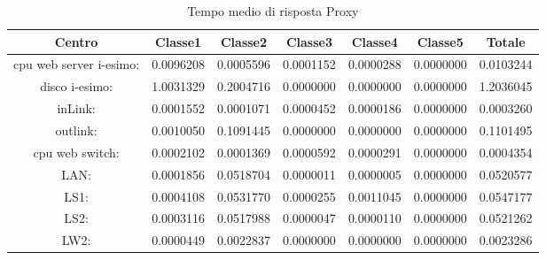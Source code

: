 \begin{table}[H]
\begin{center}\begin{scriptsize}
\begin{tabular}{||c|c|c|c|c|c|c||}
\hline
Centro &Classe1 &Classe2 &Classe3 &Classe4 &Classe5 &Totale\\
\hline
\hline
 cpu web server i-esimo: 	&0.0096208	&0.0005596	&0.0001152	&0.0000288	&0.0000000	&0.0103244\\
\hline
 disco i-esimo: 	&1.0031329	&0.2004716	&0.0000000	&0.0000000	&0.0000000	&1.2036045\\
\hline
 inLink: 	&0.0001552	&0.0001071	&0.0000452	&0.0000186	&0.0000000	&0.0003260\\
\hline
 outlink: 	&0.0010050	&0.1091445	&0.0000000	&0.0000000	&0.0000000	&0.1101495\\
\hline
 cpu web switch: 	&0.0002102	&0.0001369	&0.0000592	&0.0000291	&0.0000000	&0.0004354\\
\hline
 LAN: 	&0.0001856	&0.0518704	&0.0000011	&0.0000005	&0.0000000	&0.0520577\\
\hline
 LS1: 	&0.0004108	&0.0531770	&0.0000255	&0.0011045	&0.0000000	&0.0547177\\
\hline
 LS2: 	&0.0003116	&0.0517988	&0.0000047	&0.0000110	&0.0000000	&0.0521262\\
\hline
 LW2: 	&0.0000449	&0.0022837	&0.0000000	&0.0000000	&0.0000000	&0.0023286\\
\hline
\end{tabular}
\end{scriptsize}\end{center}
\caption{Tempo medio di risposta Proxy}
\label{tempomediodirisposta}
\end{table}

